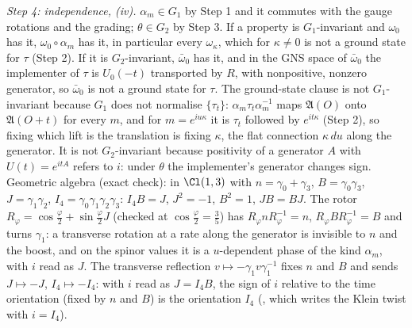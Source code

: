 \emph{Step 4: independence, (iv).} $\alpha_{m} \in G_{1}$ by Step 1 and it commutes with the gauge rotations and the grading; $\theta \in G_{2}$ by Step 3. If a property is $G_{1}$-invariant and $\omega_{0}$ has it, $\omega_{0}\circ\alpha_{m}$ has it, in particular every $\omega_{\kappa}$, which for $\kappa \neq 0$ is not a ground state for $\tau$ (Step 2). If it is $G_{2}$-invariant, $\bar\omega_{0}$ has it, and in the GNS space of $\bar\omega_{0}$ the implementer of $\tau$ is $U_{0}(-t)$ transported by $R$, with nonpositive, nonzero generator, so $\bar\omega_{0}$ is not a ground state for $\tau$. The ground-state clause is not $G_{1}$-invariant because $G_{1}$ does not normalise $\{\tau_{t}\}$: $\alpha_{m}\tau_{t}\alpha_{m}^{-1}$ maps $\mathfrak{A}(O)$ onto $\mathfrak{A}(O + t)$ for every $m$, and for $m = e^{iu\kappa}$ it is $\tau_{t}$ followed by $e^{it\kappa}$ (Step 2), so fixing which lift is the translation is fixing $\kappa$, the flat connection $\kappa\,du$ along the generator. It is not $G_{2}$-invariant because positivity of a generator $A$ with $U(t) = e^{itA}$ refers to $i$: under $\theta$ the implementer's generator changes sign. Geometric algebra (exact check): in $\Cl(1,3)$ with $n = \gamma_{0} + \gamma_{3}$, $B = \gamma_{0}\gamma_{3}$, $J = \gamma_{1}\gamma_{2}$, $I_{4} = \gamma_{0}\gamma_{1}\gamma_{2}\gamma_{3}$: $I_{4}B = J$, $J^{2} = -1$, $B^{2} = 1$, $JB = BJ$. The rotor $R_{\varphi} = \cos\tfrac{\varphi}{2} + \sin\tfrac{\varphi}{2}J$ (checked at $\cos\tfrac{\varphi}{2} = \tfrac35$) has $R_{\varphi}nR_{\varphi}^{-1} = n$, $R_{\varphi}BR_{\varphi}^{-1} = B$ and turns $\gamma_{1}$: a transverse rotation at a rate along the generator is invisible to $n$ and the boost, and on the spinor values it is a $u$-dependent phase of the kind $\alpha_{m}$, with $i$ read as $J$. The transverse reflection $v \mapsto -\gamma_{1}v\gamma_{1}^{-1}$ fixes $n$ and $B$ and sends $J \mapsto -J$, $I_{4} \mapsto -I_{4}$: with $i$ read as $J = I_{4}B$, the sign of $i$ relative to the time orientation (fixed by $n$ and $B$) is the orientation $I_{4}$ (, which writes the Klein twist with $i = I_{4}$).

